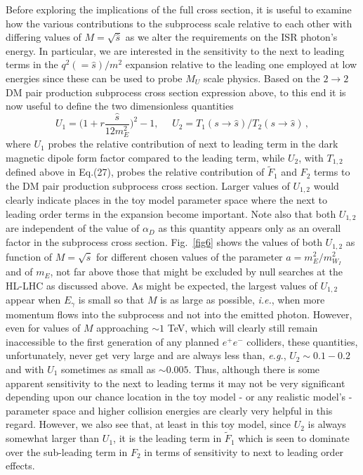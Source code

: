 \documentclass[14pt]{article}
\def\ie{{\it i.e.}}
\def\eg{{\it e.g.}}
\def\to{\rightarrow}
\begin{document}
{Before exploring the implications of the full cross section, it is useful to examine how the various contributions to the subprocess scale relative to each other with differing values of $M=\sqrt {\hat s}$ as 
we alter the requirements on the ISR photon's energy.  In particular, we are interested in the sensitivity to the next to leading terms in the $q^2(=\hat s)/m^2$ expansion relative to the leading 
one employed at low energies since these can be used to probe $M_U$ scale physics. Based on the $2\to 2$ DM pair production subprocess cross section expression above, to this end it is now 
useful to define the two dimensionless quantities
%
\begin{equation}
U_1=\Big(1+r\frac{\hat s}{12m_E^2}\Big)^2-1,~~~~~~ U_2=T_1(s\to \hat s)/T_2(s\to \hat s)\,,  
\end{equation}
%
where $U_1$ probes the relative contribution of next to leading term in the dark magnetic dipole form factor compared to the leading term, while $U_2$, with $T_{1,2}$ defined above in 
Eq.(27), probes the relative contribution of $\tilde F_1$ and $F_2$ terms to the DM pair production subprocess cross section. Larger values of $U_{1,2}$ would clearly indicate places in the toy model 
parameter space where the 
next to leading order terms in the expansion become important. Note also that both $U_{1,2}$ are independent of the value of $\alpha_D$ as this quantity appears 
only as an overall factor in the subprocess cross section. Fig.~\ref{fig6} shows the values of both $U_{1,2}$ as function of $M=\sqrt {\hat s}$ for different chosen values of the parameter 
$a=m_E^2/m_{W_I}^2$ and of $m_E$, not far above those that might be excluded by null searches at the HL-LHC as discussed above. As might be expected, the largest values of $U_{1,2}$ 
appear when $E_\gamma$ is small so that $M$ is as large as possible, \ie, when more momentum flows into the subprocess and not into the emitted photon. However, even for values of 
$M$ approaching $\sim 1$ TeV, which will clearly still remain inaccessible to the first generation of any planned $e^+e^-$ colliders, these quantities, unfortunately, never get very large and are always less 
than, \eg, $U_2\sim 0.1-0.2$ and with $U_1$ sometimes as small as $\sim 0.005$. Thus, although there is some apparent sensitivity to the next to leading terms it may not be very significant depending 
upon our chance location in the toy model - or any realistic model's - parameter space and higher collision energies are clearly very helpful in this regard. However, we also see that, at least in this 
toy model, since $U_2$ is always somewhat larger than $U_1$, it is the leading term in $\tilde F_1$ which is seen to dominate over the sub-leading term in $F_2$ in terms of sensitivity to next to leading 
order effects. 

}
\end{document}
